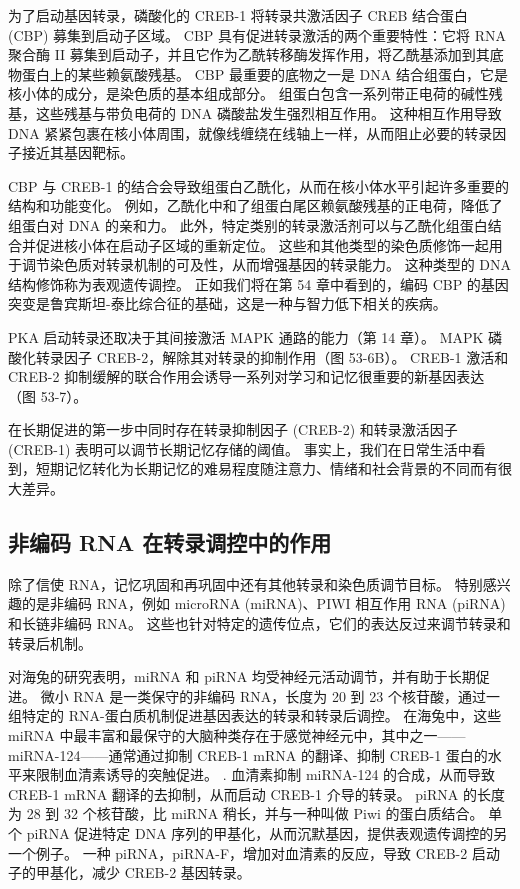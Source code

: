 为了启动基因转录，磷酸化的 CREB-1 将转录共激活因子 CREB 结合蛋白 (CBP) 募集到启动子区域。 CBP 具有促进转录激活的两个重要特性：它将 RNA 聚合酶 II 募集到启动子，并且它作为乙酰转移酶发挥作用，将乙酰基添加到其底物蛋白上的某些赖氨酸残基。 CBP 最重要的底物之一是 DNA 结合组蛋白，它是核小体的成分，是染色质的基本组成部分。 组蛋白包含一系列带正电荷的碱性残基，这些残基与带负电荷的 DNA 磷酸盐发生强烈相互作用。 这种相互作用导致 DNA 紧紧包裹在核小体周围，就像线缠绕在线轴上一样，从而阻止必要的转录因子接近其基因靶标。

CBP 与 CREB-1 的结合会导致组蛋白乙酰化，从而在核小体水平引起许多重要的结构和功能变化。 例如，乙酰化中和了组蛋白尾区赖氨酸残基的正电荷，降低了组蛋白对 DNA 的亲和力。 此外，特定类别的转录激活剂可以与乙酰化组蛋白结合并促进核小体在启动子区域的重新定位。 这些和其他类型的染色质修饰一起用于调节染色质对转录机制的可及性，从而增强基因的转录能力。 这种类型的 DNA 结构修饰称为表观遗传调控。 正如我们将在第 54 章中看到的，编码 CBP 的基因突变是鲁宾斯坦-泰比综合征的基础，这是一种与智力低下相关的疾病。

PKA 启动转录还取决于其间接激活 MAPK 通路的能力（第 14 章）。 MAPK 磷酸化转录因子 CREB-2，解除其对转录的抑制作用（图 53-6B）。 CREB-1 激活和 CREB-2 抑制缓解的联合作用会诱导一系列对学习和记忆很重要的新基因表达（图 53-7）。

在长期促进的第一步中同时存在转录抑制因子 (CREB-2) 和转录激活因子 (CREB-1) 表明可以调节长期记忆存储的阈值。 事实上，我们在日常生活中看到，短期记忆转化为长期记忆的难易程度随注意力、情绪和社会背景的不同而有很大差异。

\subsection{非编码 RNA 在转录调控中的作用}
除了信使 RNA，记忆巩固和再巩固中还有其他转录和染色质调节目标。 特别感兴趣的是非编码 RNA，例如 microRNA (miRNA)、PIWI 相互作用 RNA (piRNA) 和长链非编码 RNA。 这些也针对特定的遗传位点，它们的表达反过来调节转录和转录后机制。

对海兔的研究表明，miRNA 和 piRNA 均受神经元活动调节，并有助于长期促进。 微小 RNA 是一类保守的非编码 RNA，长度为 20 到 23 个核苷酸，通过一组特定的 RNA-蛋白质机制促进基因表达的转录和转录后调控。 在海兔中，这些 miRNA 中最丰富和最保守的大脑种类存在于感觉神经元中，其中之一——miRNA-124——通常通过抑制 CREB-1 mRNA 的翻译、抑制 CREB-1 蛋白的水平来限制血清素诱导的突触促进。 . 血清素抑制 miRNA-124 的合成，从而导致 CREB-1 mRNA 翻译的去抑制，从而启动 CREB-1 介导的转录。 piRNA 的长度为 28 到 32 个核苷酸，比 miRNA 稍长，并与一种叫做 Piwi 的蛋白质结合。 单个 piRNA 促进特定 DNA 序列的甲基化，从而沉默基因，提供表观遗传调控的另一个例子。 一种 piRNA，piRNA-F，增加对血清素的反应，导致 CREB-2 启动子的甲基化，减少 CREB-2 基因转录。

